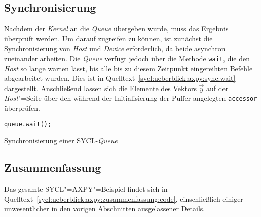 \subsection{Synchronisierung}
\label{sycl:ueberblick:axpy:sync}

Nachdem der \textit{Kernel} an die \textit{Queue} übergeben wurde, muss das
Ergebnis überprüft werden. Um darauf zugreifen zu können, ist zunächst die
Synchronisierung von \textit{Host} und \textit{Device} erforderlich, da beide
asynchron zueinander arbeiten. Die \textit{Queue} verfügt jedoch über die
Methode \texttt{wait}, die den \textit{Host} so lange warten lässt, bis alle bis
zu diesem Zeitpunkt eingereihten Befehle abgearbeitet wurden. Dies ist in
Quelltext~\ref{sycl:ueberblick:axpy:sync:wait} dargestellt. Anschließend
lassen sich die Elemente des Vektors $\vec{y}$ auf der \textit{Host}"=Seite
über den während der Initialisierung der Puffer angelegten \texttt{accessor}
überprüfen.

\begin{code}
    \begin{verbatim}
queue.wait();
    \end{verbatim}
    \caption{Synchronisierung einer SYCL-\textit{Queue}}
    \label{sycl:ueberblick:axpy:sync:wait}
\end{code}

\subsection{Zusammenfassung}
\label{sycl:ueberblick:axpy:zusammenfassung}

Das gesamte SYCL"=AXPY"=Beispiel findet sich in
Quelltext~\ref{sycl:ueberblick:axpy:zusammenfassung:code}, einschließlich
einiger unwesentlicher in den vorigen Abschnitten ausgelassener Details.

